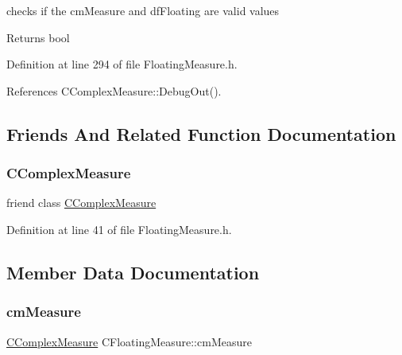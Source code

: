 checks if the cm\+Measure and df\+Floating are valid values 

\begin{DoxyReturn}{Returns}
bool 
\end{DoxyReturn}


Definition at line 294 of file Floating\+Measure.\+h.



References C\+Complex\+Measure\+::\+Debug\+Out().



\subsection{Friends And Related Function Documentation}
\mbox{\label{classCFloatingMeasure_a2af9f0d4f7a8de5099b8d23df211b616}} 
\subsubsection{\texorpdfstring{C\+Complex\+Measure}{CComplexMeasure}}
{\footnotesize\ttfamily friend class \hyperlink{classCComplexMeasure}{C\+Complex\+Measure}\hspace{0.3cm}{\ttfamily [friend]}}



Definition at line 41 of file Floating\+Measure.\+h.



\subsection{Member Data Documentation}
\mbox{\label{classCFloatingMeasure_a3a23946016d1b7f41a1ecf05f4d5d5c6}} 
\subsubsection{\texorpdfstring{cm\+Measure}{cmMeasure}}
{\footnotesize\ttfamily \hyperlink{classCComplexMeasure}{C\+Complex\+Measure} C\+Floating\+Measure\+::cm\+Measure\hspace{0.3cm}{\ttfamily [protected]}}



